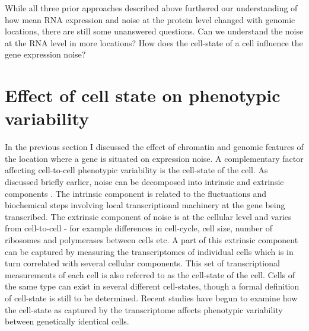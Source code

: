 While all three prior approaches described above furthered our understanding of how mean RNA expression and noise at the protein level changed with genomic locations, there are still some unanswered questions. Can we understand the noise at the RNA level in more locations? How does the cell-state of a cell influence the gene expression noise?

\section{Effect of cell state on phenotypic variability}

In the previous section I discussed the effect of chromatin and genomic features of the location where a gene is situated on expression noise. A complementary factor affecting cell-to-cell phenotypic variability is the cell-state of the cell. As discussed briefly earlier, noise can be decomposed into intrinsic and extrinsic components \cite{swain2002pnas} \cite{raser_noise_2005}. The intrinsic component is related to the fluctuations and biochemical steps involving local transcriptional machinery at the gene being transcribed. The extrinsic component of noise is at the cellular level and varies from cell-to-cell - for example differences in cell-cycle, cell size, number of ribosomes and polymerases between cells etc. A part of this extrinsic component can be captured by measuring the transcriptomes of individual cells \cite{macosko2015c} which is in turn correlated with several cellular components. This set of transcriptional measurements of each cell is also referred to as the cell-state of the cell. Cells of the same type can exist in several different cell-states, though a formal definition of cell-state is still to be determined. Recent studies have begun to examine how the cell-state as captured by the transcriptome affects phenotypic variability between genetically identical cells.

